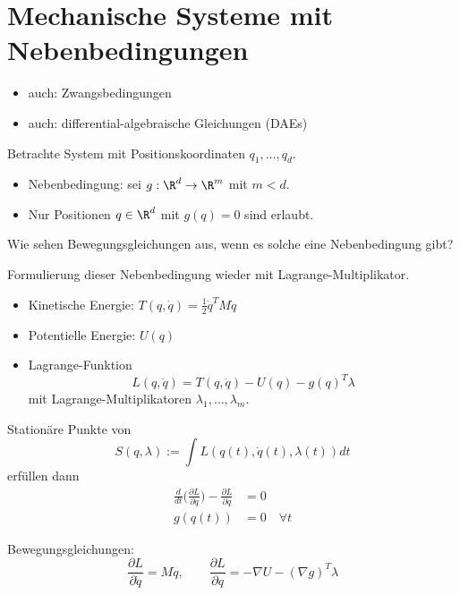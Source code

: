 \section{Mechanische Systeme mit Nebenbedingungen}

\begin{itemize}
\item auch: Zwangsbedingungen
\item auch: differential-algebraische Gleichungen (DAEs)
\end{itemize}

Betrachte System mit Positionskoordinaten $q_1, \dots, q_d$.
\begin{itemize}
\item Nebenbedingung: sei $g: \R^d \to \R^m$ mit $m < d$.
\item Nur Positionen $q \in \R^d$ mit $g(q) = 0$ sind erlaubt.
\end{itemize}

Wie sehen Bewegungsgleichungen aus, wenn es solche eine Nebenbedingung gibt?

Formulierung dieser Nebenbedingung wieder mit Lagrange-Multiplikator.

\begin{itemize}
\item Kinetische Energie: $T(q, \dot q) = \frac12 \dot q^T M \dot q$
\item Potentielle Energie: $U(q)$
\item Lagrange-Funktion
  \begin{equation*}
    L(q, \dot q) = T(q, \dot q) - U(q) - g(q)^T \lambda
  \end{equation*}
  mit Lagrange-Multiplikatoren $\lambda_1, \dots, \lambda_m$.
\end{itemize}

Stationäre Punkte von
\begin{equation*}
  S(q, \lambda) := \int L(q(t), \dot q(t), \lambda(t)) dt
\end{equation*}
erfüllen dann
\begin{align*}
  \frac{d}{dt}\big( \frac{\partial L}{\partial \dot q} \big) - \frac{\partial L}{\partial q} & = 0 \\
  g(q(t)) & = 0 \quad \forall t
\end{align*}

Bewegungsgleichungen:
\begin{equation*}
  \frac{\partial L}{\partial \dot q} = M \dot q,
  \qquad
  \frac{\partial L}{\partial q} = - \nabla U - (\nabla g)^T \lambda
\end{equation*}

